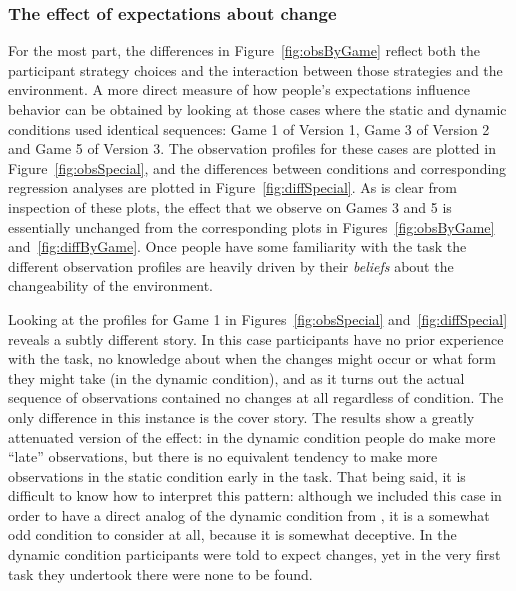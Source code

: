 \documentclass[authoryear]{elsarticle}
\newcommand{\subsubsectionX}[1]{\subsubsection{#1}}
\begin{document}
\subsubsectionX{The effect of expectations about change}

For the most part, the differences in Figure~\ref{fig:obsByGame} reflect both the participant strategy choices and the interaction between those strategies and the environment. A more direct measure of how people's expectations influence behavior can be obtained by looking at those cases where the static and dynamic conditions used identical sequences: Game 1 of Version 1, Game 3 of Version 2 and Game 5 of Version 3. The observation profiles for these cases are plotted in Figure~\ref{fig:obsSpecial}, and the differences between conditions and corresponding regression analyses are plotted in Figure~\ref{fig:diffSpecial}. As is clear from inspection of these plots, the effect that we observe on Games 3 and 5 is essentially unchanged from the corresponding plots in Figures~\ref{fig:obsByGame} and~\ref{fig:diffByGame}. Once people have some familiarity with the task the different observation profiles are heavily driven by their {\it beliefs} about the changeability of the environment.

Looking at the profiles for Game 1 in Figures~\ref{fig:obsSpecial} and~\ref{fig:diffSpecial} reveals a subtly different story. In this case participants have no prior experience with the task, no knowledge about when the changes might occur or what form they might take (in the dynamic condition), and as it turns out the actual sequence of observations contained no changes at all regardless of condition. The only difference in this instance is the cover story. The results show a greatly attenuated version of the effect: in the dynamic condition people do make more ``late'' observations, but there is no equivalent tendency to make more observations in the static condition early in the task. That being said, it is difficult to know how to interpret this pattern: although we included this case in order to have a direct analog of the dynamic condition from \cite{tversky_information_1966}, it is a somewhat odd condition to consider at all, because it is somewhat deceptive. In the dynamic condition participants were told to expect changes, yet in the very first task they undertook there were none to be found.
\end{document}
